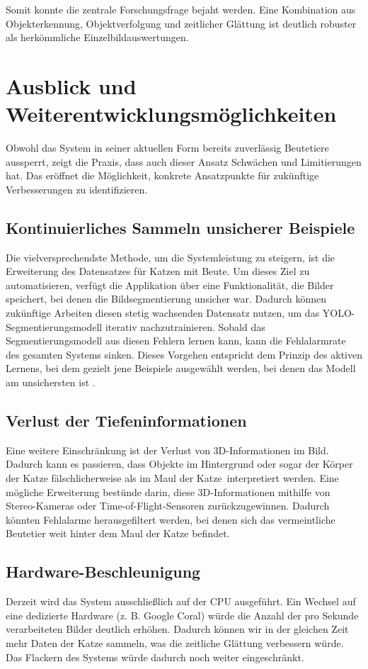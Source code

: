 Somit konnte die zentrale Forschungsfrage bejaht werden. Eine Kombination aus Objekterkennung, Objektverfolgung und zeitlicher Glättung ist deutlich robuster als herkömmliche Einzelbildauswertungen.

\section{Ausblick und Weiterentwicklungsmöglichkeiten}
\label{subsec:ausblick}

Obwohl das System in seiner aktuellen Form bereits zuverlässig Beutetiere aussperrt, zeigt die Praxis, dass auch dieser Ansatz Schwächen und Limitierungen hat. Das eröffnet die Möglichkeit, konkrete Ansatzpunkte für zukünftige Verbesserungen zu identifizieren.

\subsection{Kontinuierliches Sammeln unsicherer Beispiele}
Die vielversprechendste Methode, um die Systemleistung zu steigern, ist die Erweiterung des Datensatzes für Katzen mit Beute. Um dieses Ziel zu automatisieren, verfügt die Applikation über eine Funktionalität, die Bilder speichert, bei denen die Bildsegmentierung unsicher war. Dadurch können zukünftige Arbeiten diesen stetig wachsenden Datensatz nutzen, um das YOLO-Segmentierungsmodell iterativ nachzutrainieren. Sobald das Segmentierungsmodell aus diesen Fehlern lernen kann, kann die Fehlalarmrate des gesamten Systems sinken. Dieses Vorgehen entspricht dem Prinzip des aktiven Lernens, bei dem gezielt jene Beispiele ausgewählt werden, bei denen das Modell am unsichersten ist \cite{settles2009active}.

\subsection{Verlust der Tiefeninformationen}
Eine weitere Einschränkung ist der Verlust von 3D-Informationen im Bild. Dadurch kann es passieren, dass Objekte im Hintergrund oder sogar der Körper der Katze fälschlicherweise als \glqq im Maul der Katze\grqq\ interpretiert werden. Eine mögliche Erweiterung bestünde darin, diese 3D-Informationen mithilfe von Stereo-Kameras oder Time-of-Flight-Sensoren zurückzugewinnen. Dadurch könnten Fehlalarme herausgefiltert werden, bei denen sich das vermeintliche Beutetier weit hinter dem Maul der Katze befindet.

\subsection{Hardware-Beschleunigung}
Derzeit wird das System ausschließlich auf der CPU ausgeführt. Ein Wechsel auf eine dedizierte Hardware (z. B. Google Coral) würde die Anzahl der pro Sekunde verarbeiteten Bilder deutlich erhöhen. Dadurch können wir in der gleichen Zeit mehr Daten der Katze sammeln, was die zeitliche Glättung verbessern würde. Das Flackern des Systems würde dadurch noch weiter eingeschränkt.

